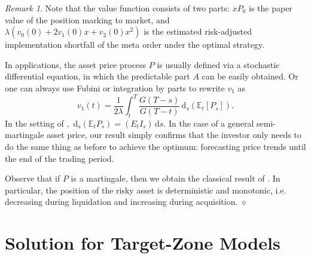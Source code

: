 \documentclass[11pt]{article}
\theoremstyle{definition}
\theoremstyle{remark}
\newtheorem{rem}[thm]{Remark}
\newcommand{\E}{\mathbb{E}} %
\newcommand{\close}{\hspace*{\fill}$\diamond$}
\newcommand{\de}{\,\mathrm{d}}
\begin{document}
\begin{rem}
Note that the value function consists of two parts: $xP_0$ is the paper value of the position marking to market, and $\lambda(v_0(0)+2v_1(0)x+v_2(0)x^2)$ is the estimated risk-adjusted implementation shortfall of the meta order under the optimal strategy.

In applications, the asset price process $P$ is usually defined via a stochastic differential equation, in which the predictable part $A$ can be easily obtained. Or one can always use Fubini or integration by parts to rewrite $v_1$ as $$v_1(t)= \frac{1}{2\lambda}\int_t^T \frac{G(T-s)}{G(T-t)} \de_s\left(\E_t[P_s]\right).$$
In the setting of \cite{lehalle2017incorporating}, $\de_s(\E_t P_s) = (E_t I_s)\de s$. In the case of a general semi-martingale asset price, our result simply confirms that the investor only needs to do the same thing as before to achieve the optimum: forecasting price trends until the end of the trading period. %

Observe that if $P$ is a martingale, then we obtain the classical result of \cite{almgren2001optimal}. In particular, the position of the risky asset is deterministic and monotonic, i.e. decreasing during liquidation and increasing during acquisition.
\close
\end{rem}



\section{Solution for Target-Zone Models}\label{s:cap}
\end{document}
